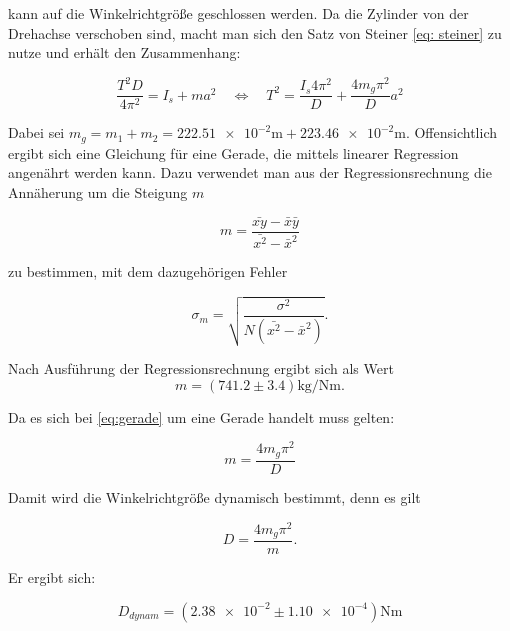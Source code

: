 kann auf die Winkelrichtgröße geschlossen werden.
Da die Zylinder von der Drehachse verschoben sind, macht man sich den
Satz von Steiner \eqref{eq: steiner} zu nutze und erhält den Zusammenhang: %

\begin{equation}
\label{eq:gerade}
\frac{T^2D}{4\pi^2}=I_s+ma^2\quad \Leftrightarrow \quad T^2=\frac{I_s 4\pi^2}{D}+\frac{4m_g\pi^2}{D}a^2
\end{equation}

Dabei sei $m_g=m_1+m_2=\num{222.51e-2}\si{\meter}+\num{223.46e-2}\si{\meter}$.
Offensichtlich ergibt sich eine Gleichung für eine Gerade, die mittels linearer
Regression angenährt werden kann. %
Dazu verwendet man aus der Regressionsrechnung
die Annäherung um die Steigung $m$

\begin{equation*}
m=\frac{\bar{xy}-\bar{x}\bar{y}}{\bar{x^2}-\bar{x}^2}
\end{equation*}

zu bestimmen, mit dem dazugehörigen Fehler

\begin{equation*}
\sigma_m=\sqrt{\frac{\sigma^2}{N(\bar{x^2}-\bar{x}^2)}}.
\end{equation*}

Nach Ausführung der Regressionsrechnung ergibt sich als Wert
\begin{equation}
\label{eq: steigung}
m=\left(\num{741.2}\pm\num{3.4}\right) \si{\kilogram\per\newton\meter}.
\end{equation}

Da es sich bei \eqref{eq:gerade} um eine Gerade handelt muss gelten:

\begin{equation*}
m=\frac{4m_g\pi^2}{D}
\end{equation*}

Damit wird die Winkelrichtgröße dynamisch bestimmt, denn es gilt %

\begin{equation*}
D=\frac{4m_g\pi^2}{m}.
\end{equation*}

Er ergibt sich:

\begin{equation}
\label{winkelrichtgroesse_dynamisch}
D_{dynam}=\left(\num{2.38e-2} \pm \num{1.10e-4}\right)\si{\newton\meter}
\end{equation}

